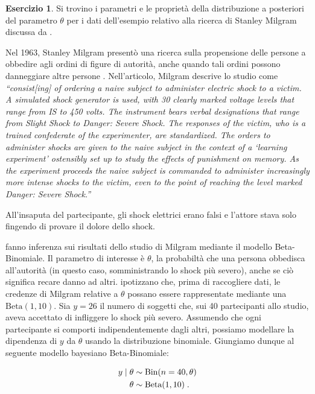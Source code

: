 \documentclass[
  11pt,
]{krantz}
\theoremstyle{definition}
\theoremstyle{definition}
\theoremstyle{definition}
\newtheorem{exercise}{Esercizio}[chapter]
\theoremstyle{definition}
\theoremstyle{remark}
\begin{document}
\begin{exercise}

Si trovino i parametri e le proprietà della distribuzione a posteriori del parametro \(\theta\) per i dati dell'esempio relativo alla ricerca di Stanley Milgram discussa da \citet{Johnson2022bayesrules}.

Nel 1963, Stanley Milgram presentò una ricerca sulla propensione delle persone a obbedire agli ordini di figure di autorità, anche quando tali ordini possono danneggiare altre persone \citep{milgram1963behavioral}. Nell'articolo, Milgram descrive lo studio come \emph{``consist{[}ing{]} of ordering a naive subject to administer electric shock to a victim. A simulated shock generator is used, with 30 clearly marked voltage levels that range from IS to 450 volts. The instrument bears verbal designations that range from Slight Shock to Danger: Severe Shock. The responses of the victim, who is a trained confederate of the experimenter, are standardized. The orders to administer shocks are given to the naive subject in the context of a `learning experiment' ostensibly set up to study the effects of punishment on memory. As the experiment proceeds the naive subject is commanded to administer increasingly more intense shocks to the victim, even to the point of reaching the level marked Danger: Severe Shock.''}

All'insaputa del partecipante, gli shock elettrici erano falsi e l'attore stava solo fingendo di provare il dolore dello shock.

\citet{Johnson2022bayesrules} fanno inferenza sui risultati dello studio di Milgram mediante il modello Beta-Binomiale. Il parametro di interesse è \(\theta\), la probabiltà che una persona obbedisca all'autorità (in questo caso, somministrando lo shock più severo), anche se ciò significa recare danno ad altri. \citet{Johnson2022bayesrules} ipotizzano che, prima di raccogliere dati, le credenze di Milgram relative a \(\theta\) possano essere rappresentate mediante una \(\mbox{Beta}(1, 10)\). Sia \(y = 26\) il numero di soggetti che, sui 40 partecipanti allo studio, aveva accettato di infliggere lo shock più severo. Assumendo che ogni partecipante si comporti indipendentemente dagli altri, possiamo modellare la dipendenza di \(y\) da \(\theta\) usando la distribuzione binomiale. Giungiamo dunque al seguente modello bayesiano Beta-Binomiale:

\begin{align}
y \mid \theta & \sim \mbox{Bin}(n = 40, \theta) \notag\\
\theta & \sim \text{Beta}(1, 10) \; . \notag
\end{align}


\end{exercise}
\end{document}
